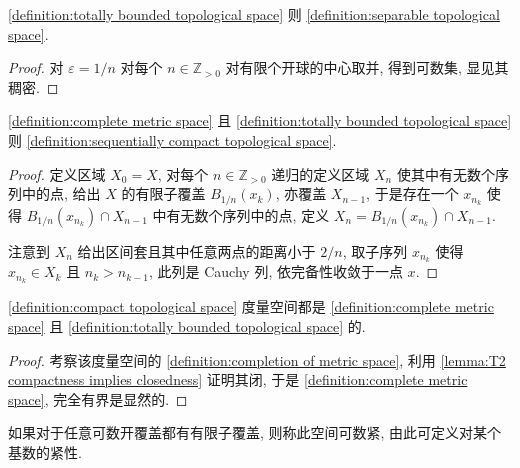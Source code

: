 \begin{lemma}
    \ref{definition:totally bounded topological space} 则 \ref{definition:separable topological space}.

    \begin{proof}
        对 \(\varepsilon = 1/n\) 对每个 \(n \in \mathbb{Z}_{> 0}\) 对有限个开球的中心取并, 得到可数集, 显见其稠密.
    \end{proof}
\end{lemma}

\begin{lemma}
    \ref{definition:complete metric space} 且 \ref{definition:totally bounded topological space} 则 \ref{definition:sequentially compact topological space}.

    \begin{proof}
        定义区域 \(X_0 = X\), 对每个 \(n \in \mathbb{Z}_{> 0}\) 递归的定义区域 \(X_n\) 使其中有无数个序列中的点,
        给出 \(X\) 的有限子覆盖 \(B_{1/n} (x_k)\), 亦覆盖 \(X_{n-1}\), 于是存在一个 \(x_{n_k}\) 使得 \(B_{1/n} (x_{n_k}) \cap X_{n-1}\)
        中有无数个序列中的点, 定义 \(X_n = B_{1/n} (x_{n_k}) \cap X_{n-1}\).

        注意到 \(X_n\) 给出区间套且其中任意两点的距离小于 \(2/n\), 取子序列 \(x_{n_k}\) 使得 \(x_{n_k} \in X_k\) 且 \(n_{k} > n_{k-1}\), 此列是 Cauchy 列,
        依完备性收敛于一点 \(x\).
    \end{proof}
\end{lemma}

\begin{lemma}
    \ref{definition:compact topological space} 度量空间都是 \ref{definition:complete metric space} 且 \ref{definition:totally bounded topological space} 的.

    \begin{proof}
        考察该度量空间的 \ref{definition:completion of metric space}, 利用 \ref{lemma:T2 compactness implies closedness} 证明其闭, 于是 \ref{definition:complete metric space}, 完全有界是显然的.
    \end{proof}
\end{lemma}

\begin{definition}[可数紧]
    \label {definition:countably compact topological space}
    如果对于任意可数开覆盖都有有限子覆盖, 则称此空间可数紧, 由此可定义对某个基数的紧性.
\end{definition}

